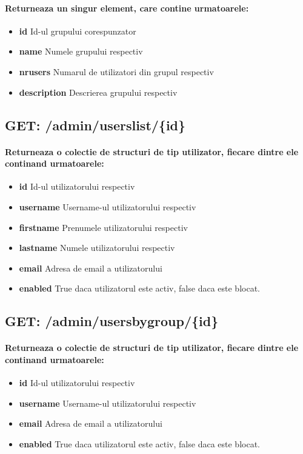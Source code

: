 \paragraph{Returneaza un singur element, care contine urmatoarele:}
\begin{itemize}
\item \textbf{id}
 Id-ul grupului corespunzator
\item \textbf{name}
 Numele grupului respectiv
\item \textbf{nrusers}
 Numarul de utilizatori din grupul respectiv
\item \textbf{description}
 Descrierea grupului respectiv
 \end{itemize}
 \subsection*{GET: /admin/userslist/\{id\}}

\paragraph{Returneaza o colectie de structuri de tip utilizator, fiecare dintre ele continand urmatoarele:}
\begin{itemize}
\item \textbf{id}
 Id-ul utilizatorului respectiv
\item \textbf{username}
 Username-ul utilizatorului respectiv
\item \textbf{firstname}
 Prenumele utilizatorului respectiv
\item \textbf{lastname}
 Numele utilizatorului respectiv
\item \textbf{email}
 Adresa de email a utilizatorului
\item \textbf{enabled}
 True daca utilizatorul este activ, false daca este blocat. 
 \end{itemize}
 \subsection*{GET: /admin/usersbygroup/\{id\}}

\paragraph{Returneaza o colectie de structuri de tip utilizator, fiecare dintre ele continand urmatoarele:}
\begin{itemize}
\item \textbf{id}
 Id-ul utilizatorului respectiv
\item \textbf{username}
 Username-ul utilizatorului respectiv
\item \textbf{email}
 Adresa de email a utilizatorului
\item \textbf{enabled}
 True daca utilizatorul este activ, false daca este blocat. 
 \end{itemize}
